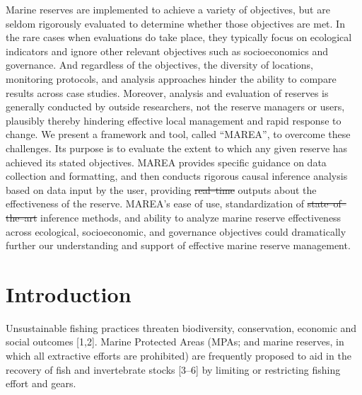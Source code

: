 \documentclass[12pt,]{article}
\providecommand{\DIFaddtex}[1]{{\protect\color{blue}\uwave{#1}}} %
\providecommand{\DIFdeltex}[1]{{\protect\color{red}\sout{#1}}}                      %
\providecommand{\DIFaddbegin}{} %
\providecommand{\DIFaddend}{} %
\providecommand{\DIFdelbegin}{} %
\providecommand{\DIFdelend}{} %
\providecommand{\DIFadd}[1]{\texorpdfstring{\DIFaddtex{#1}}{#1}} %
\providecommand{\DIFdel}[1]{\texorpdfstring{\DIFdeltex{#1}}{}} %
\newcommand{\DIFscaledelfig}{0.5}
\newlength{\DIFdelgraphicswidth} %
\newlength{\DIFdelgraphicsheight} %
\newcommand{\DIFaddincludegraphics}[2][]{{\color{blue}\fbox{\DIFOincludegraphics[#1]{#2}}}} %
\newcommand{\DIFdelincludegraphics}[2][]{%
\sbox{\DIFdelgraphicsbox}{\DIFOincludegraphics[#1]{#2}}%
\settoboxwidth{\DIFdelgraphicswidth}{\DIFdelgraphicsbox} %
\settoboxtotalheight{\DIFdelgraphicsheight}{\DIFdelgraphicsbox} %
\scalebox{\DIFscaledelfig}{%
\parbox[b]{\DIFdelgraphicswidth}{\usebox{\DIFdelgraphicsbox}\\[-\baselineskip] \rule{\DIFdelgraphicswidth}{0em}}\llap{\resizebox{\DIFdelgraphicswidth}{\DIFdelgraphicsheight}{%
\setlength{\unitlength}{\DIFdelgraphicswidth}%
\begin{picture}(1,1)%
\thicklines\linethickness{2pt} %
{\color[rgb]{1,0,0}\put(0,0){\framebox(1,1){}}}%
{\color[rgb]{1,0,0}\put(0,0){\line( 1,1){1}}}%
{\color[rgb]{1,0,0}\put(0,1){\line(1,-1){1}}}%
\end{picture}%
}\hspace*{3pt}}} %
} %
\DeclareRobustCommand{\DIFaddbegin}{\DIFOaddbegin \let\includegraphics\DIFaddincludegraphics} %
\DeclareRobustCommand{\DIFaddend}{\DIFOaddend \let\includegraphics\DIFOincludegraphics} %
\DeclareRobustCommand{\DIFdelbegin}{\DIFOdelbegin \let\includegraphics\DIFdelincludegraphics} %
\DeclareRobustCommand{\DIFdelend}{\DIFOaddend \let\includegraphics\DIFOincludegraphics} %
\begin{document}
Marine reserves are implemented to achieve a variety of objectives, but
are seldom rigorously evaluated to determine whether those objectives
are met. In the rare cases when evaluations do take place, they
typically focus on ecological indicators and ignore other relevant
objectives such as socioeconomics and governance. And regardless of the
objectives, the diversity of locations, monitoring protocols, and
analysis approaches hinder the ability to compare results across case
studies. Moreover, analysis and evaluation of reserves is generally
conducted by outside researchers, not the reserve managers or users,
plausibly thereby hindering effective local management and rapid
response to change. We present a framework and tool, called ``MAREA'',
to overcome these challenges. Its purpose is to evaluate the extent to
which any given reserve has achieved its stated objectives. MAREA
provides specific guidance on data collection and formatting, and then
conducts rigorous causal inference analysis based on data input by the
user, providing \DIFdelbegin \DIFdel{real--time }\DIFdelend \DIFaddbegin \DIFadd{real-time }\DIFaddend outputs about the effectiveness of the
reserve. MAREA's ease of use, standardization of \DIFdelbegin \DIFdel{state--of--the--art
}\DIFdelend \DIFaddbegin \DIFadd{state-of-the-art
}\DIFaddend inference methods, and ability to analyze marine reserve effectiveness
across ecological, socioeconomic, and governance objectives could
dramatically further our understanding and support of effective marine
reserve management.

\section{Introduction}\label{introduction}

Unsustainable fishing practices threaten biodiversity, conservation,
economic and social outcomes {[}1,2{]}. Marine Protected Areas (MPAs;
and marine reserves, in which all extractive efforts are prohibited) are
frequently proposed to aid in the recovery of fish and invertebrate
stocks {[}3--6{]} by limiting or restricting fishing effort and gears.
\end{document}
